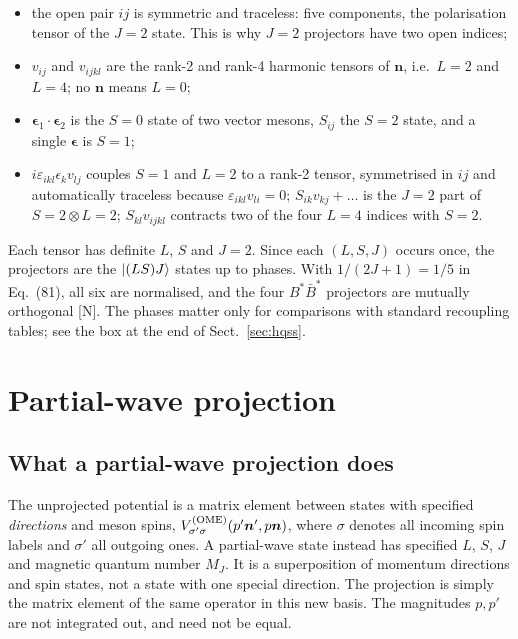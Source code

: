 \documentclass[11pt,a4paper]{article}
\newcommand{\tagN}{\textcolor{red!70!black}{\textsf{\small[N]}}}
\newcommand{\BstBst}{B^*\bar B^*}
\newcommand{\VOME}{V^{\rm (OME)}}
\newcommand{\vn}{\bm n}
\newcommand{\veps}{\bm\epsilon}
\begin{document}
\begin{itemize}
\item the open pair $ij$ is symmetric and traceless: five components, the polarisation tensor of the $J=2$ state. This is why $J=2$ projectors have two open indices;
\item $v_{ij}$ and $v_{ijkl}$ are the rank-2 and rank-4 harmonic tensors of $\vn$, i.e.\ $L=2$ and $L=4$; no $\vn$ means $L=0$;
\item $\veps_1\cdot\veps_2$ is the $S=0$ state of two vector mesons, $S_{ij}$ the $S=2$ state, and a single $\veps$ is $S=1$;
\item $i\varepsilon_{ikl}\epsilon_kv_{lj}$ couples $S=1$ and $L=2$ to a rank-2 tensor, symmetrised in $ij$ and automatically traceless because $\varepsilon_{ikl}v_{li}=0$; $S_{ik}v_{kj}+\dots$ is the $J=2$ part of $S=2\otimes L=2$; $S_{kl}v_{ijkl}$ contracts two of the four $L=4$ indices with $S=2$.
\end{itemize}
Each tensor has definite $L$, $S$ and $J=2$. Since each $(L,S,J)$ occurs once, the projectors are the $\ket{(LS)J}$ states up to phases. With $1/(2J+1)=1/5$ in Eq.~(81), all six are normalised, and the four $\BstBst$ projectors are mutually orthogonal \tagN. The phases matter only for comparisons with standard recoupling tables; see the box at the end of Sect.~\ref{sec:hqss}.

\section{Partial-wave projection}
\label{sec:method}

\subsection{What a partial-wave projection does}

The unprojected potential is a matrix element between states with specified \emph{directions} and meson spins,
$\VOME_{\sigma'\sigma}(p'\vn',p\vn)$, where $\sigma$ denotes all incoming spin labels and $\sigma'$ all outgoing ones. A partial-wave state instead has specified $L$, $S$, $J$ and magnetic quantum number $M_J$. It is a superposition of momentum directions and spin states, not a state with one special direction. The projection is simply the matrix element of the same operator in this new basis. The magnitudes $p,p'$ are not integrated out, and need not be equal.
\end{document}
